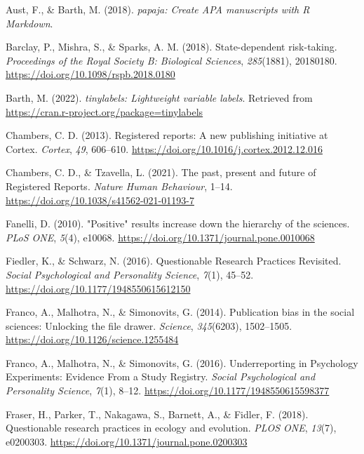 \documentclass[british,,doc,mask,floatsintext]{apa6}
\begin{document}
\leavevmode\hypertarget{ref-R-papaja}{}%
Aust, F., \& Barth, M. (2018). \emph{papaja: Create APA manuscripts with R Markdown}.

\leavevmode\hypertarget{ref-Barclay2018}{}%
Barclay, P., Mishra, S., \& Sparks, A. M. (2018). State-dependent risk-taking. \emph{Proceedings of the Royal Society B: Biological Sciences}, \emph{285}(1881), 20180180. \url{https://doi.org/10.1098/rspb.2018.0180}

\leavevmode\hypertarget{ref-R-tinylabels}{}%
Barth, M. (2022). \emph{tinylabels: Lightweight variable labels}. Retrieved from \url{https://cran.r-project.org/package=tinylabels}

\leavevmode\hypertarget{ref-Chambers2013}{}%
Chambers, C. D. (2013). Registered reports: A new publishing initiative at Cortex. \emph{Cortex}, \emph{49}, 606--610. \url{https://doi.org/10.1016/j.cortex.2012.12.016}

\leavevmode\hypertarget{ref-Chambers2021}{}%
Chambers, C. D., \& Tzavella, L. (2021). The past, present and future of Registered Reports. \emph{Nature Human Behaviour}, 1--14. \url{https://doi.org/10.1038/s41562-021-01193-7}

\leavevmode\hypertarget{ref-Fanelli2010}{}%
Fanelli, D. (2010). "Positive" results increase down the hierarchy of the sciences. \emph{PLoS ONE}, \emph{5}(4), e10068. \url{https://doi.org/10.1371/journal.pone.0010068}

\leavevmode\hypertarget{ref-Fiedler2016}{}%
Fiedler, K., \& Schwarz, N. (2016). Questionable Research Practices Revisited. \emph{Social Psychological and Personality Science}, \emph{7}(1), 45--52. \url{https://doi.org/10.1177/1948550615612150}

\leavevmode\hypertarget{ref-Franco2014}{}%
Franco, A., Malhotra, N., \& Simonovits, G. (2014). Publication bias in the social sciences: Unlocking the file drawer. \emph{Science}, \emph{345}(6203), 1502--1505. \url{https://doi.org/10.1126/science.1255484}

\leavevmode\hypertarget{ref-Franco2016}{}%
Franco, A., Malhotra, N., \& Simonovits, G. (2016). Underreporting in Psychology Experiments: Evidence From a Study Registry. \emph{Social Psychological and Personality Science}, \emph{7}(1), 8--12. \url{https://doi.org/10.1177/1948550615598377}

\leavevmode\hypertarget{ref-Fraser2018}{}%
Fraser, H., Parker, T., Nakagawa, S., Barnett, A., \& Fidler, F. (2018). Questionable research practices in ecology and evolution. \emph{PLOS ONE}, \emph{13}(7), e0200303. \url{https://doi.org/10.1371/journal.pone.0200303}
\end{document}
